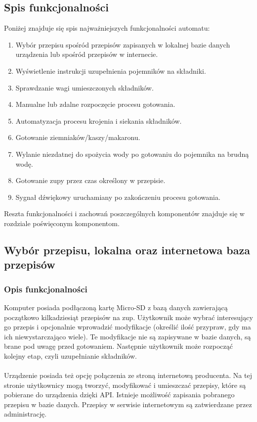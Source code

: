 \documentclass[12pt,a4paper,notitlepage]{article}
\begin{document}
\subsection{Spis funkcjonalności}
Poniżej znajduje się spis najważniejszych funkcjonalności automatu:
\begin{enumerate}
  \item Wybór przepisu spośród przepisów zapisanych w lokalnej bazie danych urządzenia lub spośród przepisów w internecie.
  \item Wyświetlenie instrukcji uzupełnienia pojemników na składniki.
  \item Sprawdzanie wagi umieszczonych składników.
  \item Manualne lub zdalne rozpoczęcie procesu gotowania.
  \item Automatyzacja procesu krojenia i siekania składników.
  \item Gotowanie ziemniaków/kaszy/makaronu.
  \item Wylanie niezdatnej do spożycia wody po gotowaniu do pojemnika na brudną wodę.
  \item Gotowanie zupy przez czas określony w przepisie.
  \item Sygnał dźwiękowy uruchamiany po zakończeniu procesu gotowania.
\end{enumerate}
Reszta funkcjonalności i zachowań poszczególnych komponentów znajduje się w rozdziale poświęconym komponentom.

\subsection{Wybór przepisu, lokalna oraz internetowa baza przepisów}
\subsubsection{Opis funkcjonalności}
Komputer posiada podłączoną kartę Micro-SD z bazą danych zawierającą początkowo kilkadziesiąt przepisów na zup. Użytkownik może wybrać interesujący go przepis i opcjonalnie wprowadzić modyfikacje (określić ilość przypraw, gdy ma ich niewystarczająco wiele). Te modyfikacje nie są zapisywane w bazie danych, są brane pod uwagę przed gotowaniem. Następnie użytkownik może rozpocząć kolejny etap, czyli uzupełnianie składników.\\ \\
Urządzenie posiada też opcję połączenia ze stroną internetową producenta. Na tej stronie użytkownicy mogą tworzyć, modyfikować i umieszczać przepisy, które są pobierane do urządzenia dzięki API. Istnieje możliwość zapisania pobranego przepisu w bazie danych. Przepisy w serwisie internetowym są zatwierdzane przez administrację.\\ \\
\end{document}
